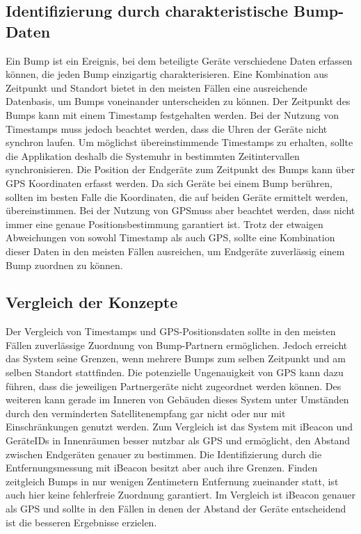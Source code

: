\subsection{Identifizierung durch charakteristische Bump-Daten}
Ein Bump ist ein Ereignis, bei dem beteiligte Geräte verschiedene Daten erfassen können, die jeden Bump einzigartig charakterisieren. Eine Kombination aus Zeitpunkt und Standort bietet in den meisten Fällen eine ausreichende Datenbasis, um Bumps voneinander unterscheiden zu können. Der Zeitpunkt des Bumps kann mit einem Timestamp festgehalten werden. Bei der Nutzung von Timestamps muss jedoch beachtet werden, dass die Uhren der Geräte nicht synchron laufen. Um möglichst übereinstimmende Timestamps zu erhalten, sollte die Applikation deshalb die Systemuhr in bestimmten Zeitintervallen synchronisieren. Die Position der Endgeräte zum Zeitpunkt des Bumps kann über \ac{GPS} Koordinaten erfasst werden. Da sich Geräte bei einem Bump berühren, sollten im besten Falle die Koordinaten, die auf beiden Geräte ermittelt werden, übereinstimmen. Bei der Nutzung von \ac{GPS}muss aber beachtet werden, dass nicht immer eine genaue Positionsbestimmung garantiert ist. Trotz der etwaigen Abweichungen von sowohl Timestamp als auch \ac{GPS}, sollte eine Kombination dieser Daten in den meisten Fällen ausreichen, um Endgeräte zuverlässig einem Bump zuordnen zu können.

\subsection{Vergleich der Konzepte}
Der Vergleich von Timestamps und \acs{GPS}-Positionsdaten sollte in den meisten Fällen zuverlässige Zuordnung von Bump-Partnern ermöglichen. Jedoch erreicht das System seine Grenzen, wenn mehrere Bumps zum selben Zeitpunkt und am selben Standort stattfinden. Die potenzielle Ungenauigkeit von \ac{GPS} kann dazu führen, dass die jeweiligen Partnergeräte nicht zugeordnet werden können. Des weiteren kann gerade im Inneren von Gebäuden dieses System unter Umständen durch den verminderten Satellitenempfang gar nicht oder nur mit Einschränkungen genutzt werden. Zum Vergleich ist das System mit iBeacon und GeräteIDs in Innenräumen besser nutzbar als \ac{GPS} und ermöglicht, den Abstand zwischen Endgeräten genauer zu bestimmen. Die Identifizierung durch die Entfernungsmessung mit iBeacon besitzt aber auch ihre Grenzen. Finden zeitgleich Bumps in nur wenigen Zentimetern Entfernung zueinander statt, ist auch hier keine fehlerfreie Zuordnung garantiert. Im Vergleich ist iBeacon genauer als \acs{GPS} und sollte in den Fällen in denen der Abstand der Geräte entscheidend ist die besseren Ergebnisse erzielen.


